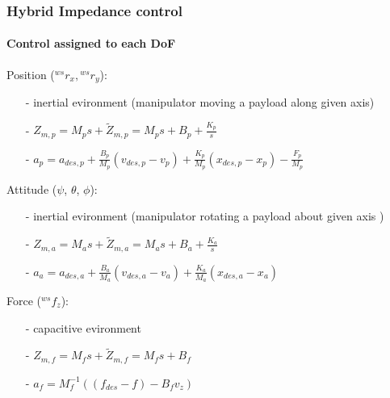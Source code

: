 \begin{frame}
  \frametitle{Hybrid Impedance control}
  \framesubtitle{Control assigned to each DoF}
  Position (${}^{ws}r_x,{}^{ws}r_y$):
  \begin{itemize}
  \item[-] inertial evironment (manipulator moving a payload along given axis)
  \item[-] $Z_{m,p} = M_p s + \tilde{Z}_{m,p} = M_p s + B_p + \frac{K_p}{s}$
  \item[-] $a_{p} = a_{des,p} + \frac{B_p}{M_p} (v_{des,p} - v_p) + \frac{K_p}{M_p} (x_{des,p} - x_p) - \frac{F_p}{M_p}$
  \end{itemize}
  Attitude ($\psi$, $\theta$, $\phi$):
  \begin{itemize}
  \item[-] inertial evironment (manipulator rotating a payload about given axis )
  \item[-] $Z_{m,a} = M_a s + \tilde{Z}_{m,a} = M_a s + B_a + \frac{K_a}{s}$
  \item[-] $a_a = a_{des,a} + \frac{B_a}{M_a} (v_{des,a} - v_a) + \frac{K_a}{M_a} (x_{des,a} - x_a)$
  \end{itemize}
  Force (${}^{ws}f_z$):
  \begin{itemize}
  \item[-] capacitive evironment
  \item[-] $Z_{m,f} = M_f s + \tilde{Z}_{m,f} = M_f s + B_f$
  \item[-] $a_{f} = M_f^{-1}((f_{des} - f) - B_f v_z)$
  \end{itemize}  
\end{frame}

